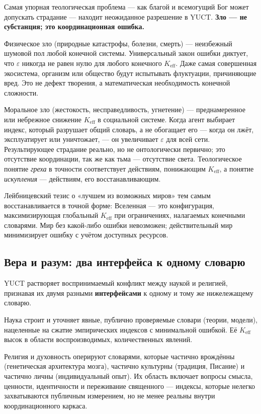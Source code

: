 \documentclass[12pt,a4paper]{article}
\begin{document}
	Самая упорная теологическая проблема — как благой и всемогущий Бог может допускать страдание — находит неожиданное разрешение в YUCT. \textbf{Зло — не субстанция; это координационная ошибка.}
	
	Физическое зло (природные катастрофы, болезни, смерть) — неизбежный шумовой пол любой конечной системы. Универсальный закон ошибки диктует, что \(\varepsilon\) никогда не равен нулю для любого конечного \(K_{\mathrm{eff}}\). Даже самая совершенная экосистема, организм или общество будут испытывать флуктуации, причиняющие вред. Это не дефект творения, а математическая необходимость конечной сложности.
	
	Моральное зло (жестокость, несправедливость, угнетение) — преднамеренное или небрежное снижение \(K_{\mathrm{eff}}\) в социальной системе. Когда агент выбирает индекс, который разрушает общий словарь, а не обогащает его — когда он лжёт, эксплуатирует или уничтожает, — он увеличивает \(\varepsilon\) для всей сети. Результирующее страдание реально, но не онтологически первично; это отсутствие координации, так же как тьма — отсутствие света. Теологическое понятие \emph{греха} в точности соответствует действиям, понижающим \(K_{\mathrm{eff}}\), а понятие \emph{искупления} — действиям, его восстанавливающим.
	
	Лейбницевский тезис о «лучшем из возможных миров» тем самым восстанавливается в точной форме: Вселенная — это конфигурация, максимизирующая глобальный \(K_{\mathrm{eff}}\) при ограничениях, налагаемых конечными словарями. Мир без какой‑либо ошибки невозможен; действительный мир минимизирует ошибку с учётом доступных ресурсов.
	
	\subsection{Вера и разум: два интерфейса к одному словарю}
	
	YUCT растворяет воспринимаемый конфликт между наукой и религией, признавая их двумя разными \textbf{интерфейсами} к одному и тому же нижележащему словарю.
	
	Наука строит и уточняет явные, публично проверяемые словари (теории, модели), нацеленные на сжатие эмпирических индексов с минимальной ошибкой. Её \(K_{\mathrm{eff}}\) высок в области воспроизводимых, количественных явлений.
	
	Религия и духовность оперируют словарями, которые частично врождённы (генетическая архитектура мозга), частично культурны (традиция, Писание) и частично личны (индивидуальный опыт). Их область включает вопросы смысла, ценности, идентичности и переживание священного — индексы, которые нелегко захватываются публичным измерением, но не менее реальны внутри координационного каркаса.
	
\end{document}
